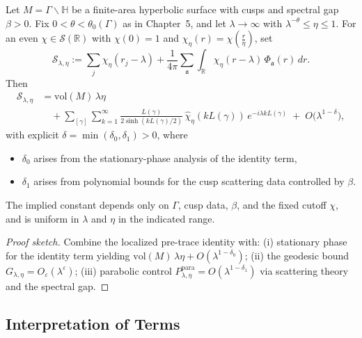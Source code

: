 \begin{theorem} \label{thm:7.2-main}
Let $M=\Gamma\backslash\mathbb{H}$ be a finite-area hyperbolic surface with cusps and spectral gap $\beta>0$.
Fix $0<\theta<\theta_0(\Gamma)$ as in Chapter~5, and let $\lambda\to\infty$ with
$\lambda^{-\theta}\le \eta\le 1$. For an even $\chi\in\mathcal{S}(\mathbb{R})$ with $\chi(0)=1$ and
$\chi_\eta(r)=\chi(\frac{r}{\eta})$, set
\[
  \mathcal{S}_{\lambda,\eta}
  := \sum_{j} \chi_\eta(r_j-\lambda)
   + \frac{1}{4\pi}\sum_{\mathfrak{a}} \int_{\mathbb{R}}
     \chi_\eta(r-\lambda)\,\Phi_{\mathfrak{a}}(r)\, dr.
\]
Then
\begin{align}
  \mathcal{S}_{\lambda,\eta}
  &= \mathrm{vol}(M)\,\lambda\eta \label{eq:7.2-final}\\
  &\quad+ \sum_{[\gamma]}\sum_{k=1}^{\infty}
      \frac{L(\gamma)}{2\sinh(k L(\gamma)/2)}\,
      \widehat{\chi}_\eta(k L(\gamma))\, e^{-i \lambda k L(\gamma)}
      \;+\; O\!\big(\lambda^{1-\delta}\big), \nonumber
\end{align}
with explicit $\delta=\min(\delta_0,\delta_1)>0$, where
\begin{itemize}
  \item $\delta_0$ arises from the stationary-phase analysis of the identity term,
  \item $\delta_1$ arises from polynomial bounds for the cusp scattering data controlled by $\beta$.
\end{itemize}
The implied constant depends only on $\Gamma$, cusp data, $\beta$, and the fixed cutoff $\chi$,
and is uniform in $\lambda$ and $\eta$ in the indicated range.
\end{theorem}

\begin{proof}[Proof sketch]
Combine the localized pre-trace identity with:
(i) stationary phase for the identity term yielding $\mathrm{vol}(M)\,\lambda\eta+O(\lambda^{1-\delta_0})$;
(ii) the geodesic bound $G_{\lambda,\eta}=O_\varepsilon(\lambda^\varepsilon)$;
(iii) parabolic control $P_{\lambda,\eta}^{\mathrm{para}}=O(\lambda^{1-\delta_1})$ via scattering theory and the spectral gap.
\end{proof}

\subsection{Interpretation of Terms} \label{subsec:7.2-interpret}

